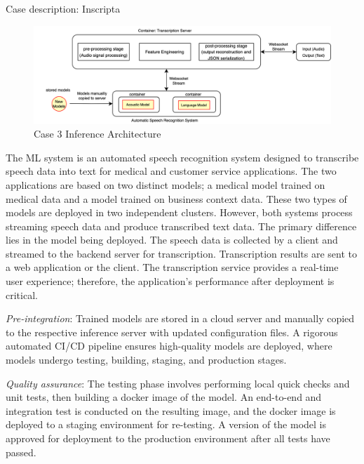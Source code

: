 Case description: Inscripta 
\begin{figure}[b]
\centering
\includegraphics[width=\linewidth]{images/case3_deployment_process.png}
\caption{Case 3 Inference Architecture}
\label{fig: case3_deployment_process}
\end{figure}


The ML system is an automated speech recognition system designed to transcribe speech data into text for medical and customer service applications. The two applications are based on two distinct models; a medical model trained on medical data and a model trained on business context data. These two types of models are deployed in two independent clusters. However, both systems process streaming speech data and produce transcribed text data. The primary difference lies in the model being deployed. The speech data is collected by a client and streamed to the backend server for transcription. Transcription results are sent to a web application or the client. The transcription service provides a real-time user experience; therefore, the application's performance after deployment is critical.

\textit{Pre-integration}: Trained models are stored in a cloud server and manually copied to the respective inference server with updated configuration files. A rigorous automated CI/CD pipeline ensures high-quality models are deployed, where models undergo testing, building, staging, and production stages. 

\textit{Quality assurance}: The testing phase involves performing local quick checks and unit tests, then building a docker image of the model. An end-to-end and integration test is conducted on the resulting image, and the docker image is deployed to a staging environment for re-testing. A version of the model is approved for deployment to the production environment after all tests have passed. 

